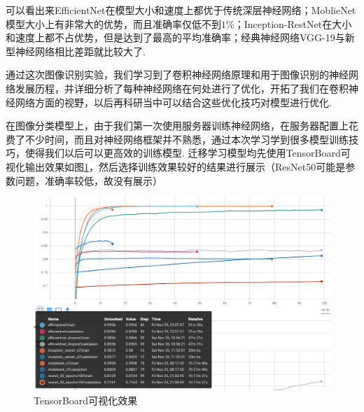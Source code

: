 \documentclass[12pt, a4paper, oneside]{ctexart}
\numberwithin{equation}{section}  %
\begin{document}
可以看出来EfficientNet在模型大小和速度上都优于传统深层神经网络；MoblieNet模型大小上有非常大的优势，而且准确率仅低不到$1\%$；Inception-RestNet在大小和速度上都不占优势，但是达到了最高的平均准确率；经典神经网络VGG-19与新型神经网络相比差距就比较大了.

通过这次图像识别实验，我们学习到了卷积神经网络原理和用于图像识别的神经网络发展历程，并详细分析了每种神经网络在何处进行了优化，开拓了我们在卷积神经网络方面的视野，以后再科研当中可以结合这些优化技巧对模型进行优化.

在图像分类模型上，由于我们第一次使用服务器训练神经网络，在服务器配置上花费了不少时间，而且对神经网络框架并不熟悉，通过本次学习学到很多模型训练技巧，使得我们以后可以更高效的训练模型. 迁移学习模型均先使用TensorBoard可视化输出效果如图\ref{fig-TensorBoard}，然后选择训练效果较好的结果进行展示（ResNet50可能是参数问题，准确率较低，故没有展示）\vspace*{-0.5cm}
\begin{figure}[htbp]
  \hspace*{-1.5cm}
  \centering
  \includegraphics[scale=0.6]{TensorBoard.png}
  \caption{TensorBoard可视化效果}
  \label{fig-TensorBoard}
\end{figure}

\clearpage
\appendix
\end{document}
